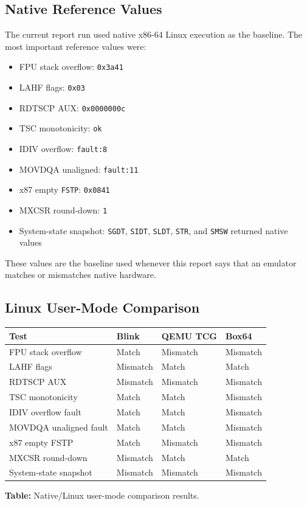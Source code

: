 
\subsection{Native Reference Values}

The current report run used native x86-64 Linux execution as the baseline. The most important reference values were:

\begin{itemize}
  \item FPU stack overflow: \texttt{0x3a41}
  \item LAHF flags: \texttt{0x03}
  \item RDTSCP AUX: \texttt{0x0000000c}
  \item TSC monotonicity: \texttt{ok}
  \item IDIV overflow: \texttt{fault:8}
  \item MOVDQA unaligned: \texttt{fault:11}
  \item x87 empty \texttt{FSTP}: \texttt{0x0841}
  \item MXCSR round-down: \texttt{1}
  \item System-state snapshot: \texttt{SGDT}, \texttt{SIDT}, \texttt{SLDT}, \texttt{STR}, and \texttt{SMSW} returned native values
\end{itemize}

These values are the baseline used whenever this report says that an emulator matches or mismatches native hardware.

\subsection{Linux User-Mode Comparison}

\begin{center}
\centering
\small
\begin{tabular}{@{}llll@{}}
\toprule
Test & Blink & QEMU TCG & Box64 \\
\midrule
FPU stack overflow & Match & Mismatch & Mismatch \\
LAHF flags & Mismatch & Match & Match \\
RDTSCP AUX & Mismatch & Mismatch & Mismatch \\
TSC monotonicity & Match & Match & Mismatch \\
IDIV overflow fault & Match & Match & Mismatch \\
MOVDQA unaligned fault & Match & Match & Mismatch \\
x87 empty FSTP & Match & Mismatch & Mismatch \\
MXCSR round-down & Mismatch & Match & Match \\
System-state snapshot & Mismatch & Mismatch & Mismatch \\
\bottomrule
\end{tabular}

\textbf{Table:} Native/Linux user-mode comparison results.
\end{center}

